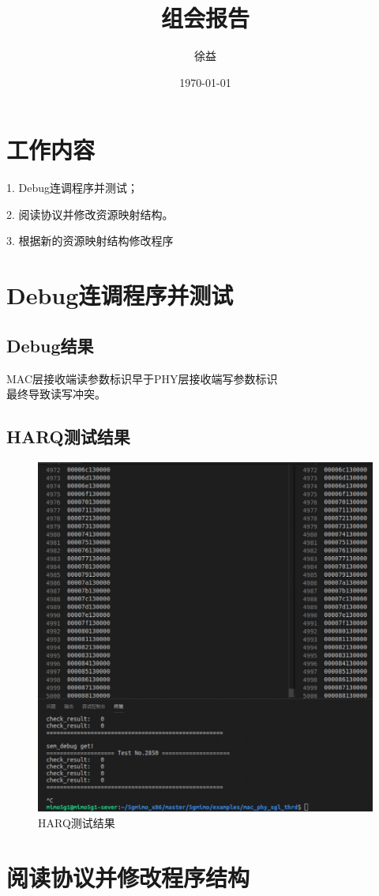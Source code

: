 \documentclass{article}
\title{组会报告}
\author{徐益}
\date{\today}
\begin{document}
\maketitle


\section{工作内容} 
1. Debug连调程序并测试；

2. 阅读协议并修改资源映射结构。

3. 根据新的资源映射结构修改程序

\section{Debug连调程序并测试}
\subsection{Debug结果}
MAC层接收端读参数标识早于PHY层接收端写参数标识\\
最终导致读写冲突。
\subsection{HARQ测试结果}
\begin{figure}[H]
	\centering
	\includegraphics[width = .6\textwidth]{compare.png}
	\caption{HARQ测试结果}
\end{figure}

\section{阅读协议并修改程序结构}
\end{document}
